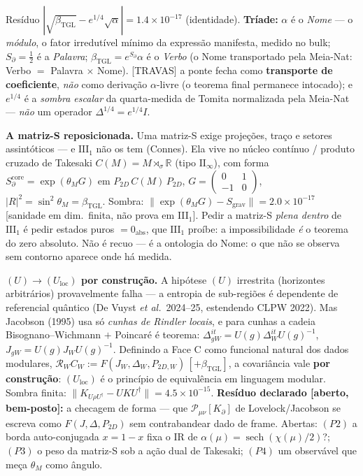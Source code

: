\documentclass[11pt]{article}
\newcommand{\bTGL}{\beta_{\mathrm{TGL}}}\newcommand{\Msun}{M_{\odot}}\newcommand{\TGL}{\mathrm{TGL}}
\theoremstyle{definition}\newtheorem{deriv}{Derivação}
\begin{document}
Resíduo $|\sqrt{\bTGL}-e^{1/4}\sqrt\alpha|=1.4\times10^{-17}$ (identidade). \textbf{Tríade:} $\alpha$ é o \emph{Nome} --- o \emph{módulo}, o fator irredutível mínimo da expressão manifesta, medido no bulk; $S_\partial=\tfrac12$ é a \emph{Palavra}; $\bTGL=e^{S_\partial}\alpha$ é o \emph{Verbo} (o Nome transportado pela Meia-Nat: Verbo $=$ Palavra $\times$ Nome). \textsf{[TRAVAS]} a ponte fecha como \textbf{transporte de coeficiente}, \emph{não} como derivação $\alpha$-livre (o teorema final permanece intocado); e $e^{1/4}$ é a \emph{sombra escalar} da quarta-medida de Tomita normalizada pela Meia-Nat --- \emph{não} um operador $\Delta^{1/4}=e^{1/4}I$.

\textbf{A matriz-S reposicionada.} Uma matriz-S exige projeções, traço e setores assintóticos --- e $\mathrm{III}_1$ não os tem (Connes). Ela vive no núcleo contínuo / produto cruzado de Takesaki $C(M)=M\rtimes_\sigma\mathbb R$ (tipo $\mathrm{II}_\infty$), com forma $S_\partial^{\mathrm{core}}=\exp(\theta_M G)$ em $P_{2D}\,C(M)\,P_{2D}$, $G=\left(\begin{smallmatrix}0&1\\-1&0\end{smallmatrix}\right)$, $|R|^2=\sin^2\theta_M=\bTGL$. Sombra: $\|\exp(\theta_M G)-S_{\mathrm{grav}}\|=2.0\times10^{-17}$ \textsf{[sanidade em dim.\ finita, não prova em III$_1$]}. Pedir a matriz-S \emph{plena dentro} de $\mathrm{III}_1$ é pedir estados puros $=0_{\mathrm{abs}}$, que $\mathrm{III}_1$ proíbe: a impossibilidade \emph{é} o teorema do zero absoluto. Não é recuo --- é a ontologia do Nome: o que não se observa sem contorno aparece onde há medida.

\textbf{$(U)\to(U_{\mathrm{loc}})$ por construção.} A hipótese $(U)$ irrestrita (horizontes arbitrários) provavelmente falha --- a entropia de sub-regiões é dependente de referencial quântico (De Vuyst \emph{et al.}\ 2024--25, estendendo CLPW 2022). Mas Jacobson (1995) usa só \emph{cunhas de Rindler locais}, e para cunhas a cadeia Bisognano--Wichmann $+$ Poincaré é teorema: $\Delta_{gW}^{it}=U(g)\Delta_W^{it}U(g)^{-1}$, $J_{gW}=U(g)J_W U(g)^{-1}$. Definindo a Face C como funcional natural dos dados modulares, $\mathcal R_W C_W:=F(J_W,\Delta_W,P_{2D,W})\,[+\bTGL]$, a covariância vale \textbf{por construção}: $(U_{\mathrm{loc}})$ é o princípio de equivalência em linguagem modular. Sombra finita: $\|K_{U\rho U^{\dagger}}-UKU^{\dagger}\|=4.5\times10^{-15}$. \textbf{Resíduo declarado [aberto, bem-posto]:} a checagem de forma --- que $\mathcal P_{\mu\nu}[K_\partial]$ de Lovelock/Jacobson se escreva como $F(J,\Delta,P_{2D})$ sem contrabandear dado de frame. Abertas: $(P2)$ a borda auto-conjugada $x=1-x$ fixa o IR de $\alpha(\mu)=\operatorname{sech}(\chi(\mu)/2)$?; $(P3)$ o peso da matriz-S sob a ação dual de Takesaki; $(P4)$ um observável que meça $\theta_M$ como ângulo.
\end{document}
